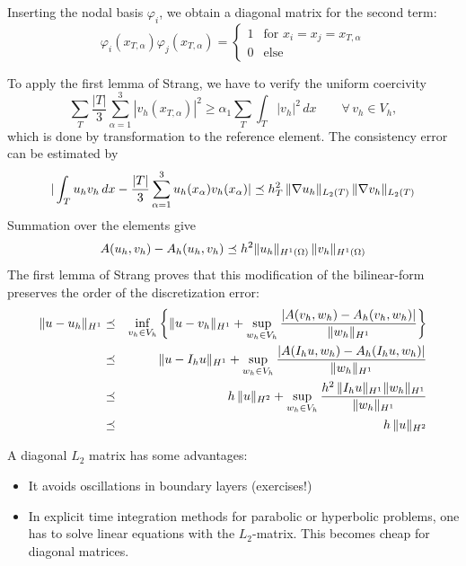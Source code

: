Inserting the nodal basis $\varphi_i$, we obtain a diagonal matrix for
the second term:
$$
\varphi_i (x_{T,\alpha}) \varphi_j (x_{T,\alpha}) = 
        \left\{ \begin{array}{cl}
                1 & \mbox{for } x_i = x_j = x_{T,\alpha} \\
                0 & \mbox{else}
        \end{array}
        \right.
$$

To apply the first lemma of Strang, we have to verify the uniform coercivity
\begin{equation}
\label{equ_uniformell}
\sum_T \frac{|T|}{3} \sum_{\alpha = 1}^3 |v_h(x_{T,\alpha})|^2 \geq 
\alpha_1 \sum_T \int_T | v_h |^2 \, dx \qquad \forall \, v_h \in V_h,
\end{equation}
which is done by transformation to the reference element.
The consistency error can be estimated by
\begin{equation}
\label{equ_consist}
| \int_T u_h v_h \, dx - \frac{|T|}{3} \sum_{\alpha=1}^3 u_h(x_\alpha) v_h(x_\alpha) |
 \preceq h_T^2 \, \| \nabla u_h \|_{L_2(T)} \, \| \nabla v_h \|_{L_2(T)}
\end{equation}
Summation over the elements give
$$
A(u_h, v_h) - A_h (u_h, v_h) \preceq h^2 \| u_h \|_{H^1(\Omega)} \, \| v_h \|_{H^1(\Omega)}
$$
The first lemma of Strang proves that this modification of the bilinear-form
preserves the order of the discretization error:
\begin{eqnarray*}
\| u - u_h \|_{H^1} & \preceq & 
 \inf_{v_h \in V_h} \left\{
        \| u - v_h \|_{H^1} + \sup_{w_h \in V_h} \frac{|A(v_h, w_h) - A_h (v_h, w_h)|}{\| w_h \|_{H^1}} \right\} \\
 & \preceq & 
        \| u - I_h u \|_{H^1} + \sup_{w_h \in V_h} \frac{|A(I_h u, w_h) - A_h (I_h u, w_h)|}{\| w_h \|_{H^1}} \\
 & \preceq &  h \, \| u \|_{H^2} + \sup_{w_h \in V_h} \frac{h^2 \, \| I_h u \|_{H^1} \| w_h \|_{H^1}}{\| w_h \|_{H^1}} \\
 &  \preceq & h \, \| u \|_{H^2}
\end{eqnarray*}

A diagonal $L_2$ matrix has some advantages:
\begin{itemize}
\item It avoids oscillations in boundary layers (exercises!)
\item In explicit time integration methods for parabolic or hyperbolic
problems, one has to solve linear equations with the $L_2$-matrix. This
becomes cheap for diagonal matrices.
\end{itemize}


